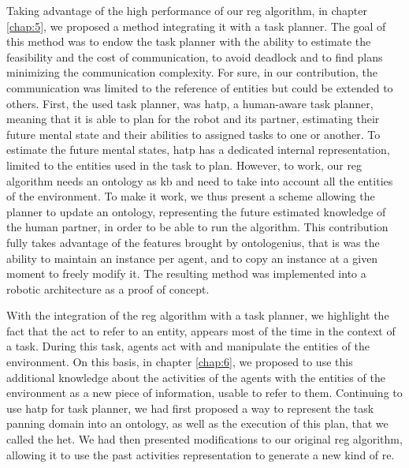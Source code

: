 Taking advantage of the high performance of our \acrshort{reg} algorithm, in chapter \ref{chap:5}, we proposed a method integrating it with a task planner. The goal of this method was to endow the task planner with the ability to estimate the feasibility and the cost of communication, to avoid deadlock and to find plans minimizing the communication complexity. For sure, in our contribution, the communication was limited to the reference of entities but could be extended to others. First, the used task planner, was \acrshort{hatp}, a human-aware task planner, meaning that it is able to plan for the robot and its partner, estimating their future mental state and their abilities to assigned tasks to one or another. To estimate the future mental states, \acrshort{hatp} has a dedicated internal representation, limited to the entities used in the task to plan. However, to work, our \acrshort{reg} algorithm needs an ontology as \acrshort{kb} and need to take into account all the entities of the environment. To make it work, we thus present a scheme allowing the planner to update an ontology, representing the future estimated knowledge of the human partner, in order to be able to run the algorithm. This contribution fully takes advantage of the features brought by ontologenius, that is was the ability to maintain an instance per agent, and to copy an instance at a given moment to freely modify it. The resulting method was implemented into a robotic architecture as a proof of concept.

With the integration of the \acrshort{reg} algorithm with a task planner, we highlight the fact that the act to refer to an entity, appears most of the time in the context of a task. During this task, agents act with and manipulate the entities of the environment. On this basis, in chapter \ref{chap:6}, we proposed to use this additional knowledge about the activities of the agents with the entities of the environment as a new piece of information, usable to refer to them. Continuing to use \acrshort{hatp} for task planner, we had first proposed a way to represent the task panning domain into an ontology, as well as the execution of this plan, that we called the \acrfull{het}. We had then presented modifications to our original \acrshort{reg} algorithm, allowing it to use the past activities representation to generate a new kind of \acrfull{re}.

